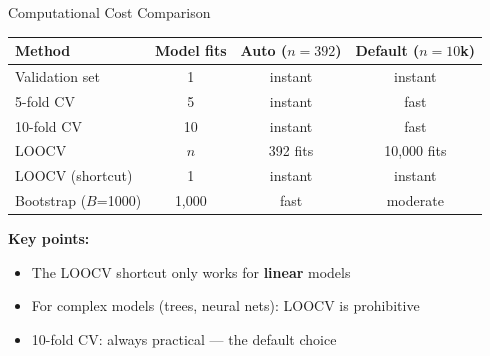 \documentclass[aspectratio=169, 11pt]{beamer}
\begin{document}
\begin{frame}{Computational Cost Comparison}

\begin{center}
\begin{tabular}{lccc}
\toprule
Method & Model fits & Auto ($n=392$) & Default ($n=10$k) \\
\midrule
Validation set & 1 & instant & instant \\
5-fold CV & 5 & instant & fast \\
10-fold CV & 10 & instant & fast \\
LOOCV & $n$ & 392 fits & 10,000 fits \\
LOOCV (shortcut) & 1 & instant & instant \\
Bootstrap ($B$=1000) & 1,000 & fast & moderate \\
\bottomrule
\end{tabular}
\end{center}

\vspace{0.5em}
\textbf{Key points:}
\begin{itemize}
  \item The LOOCV shortcut only works for \textbf{linear} models
  \item For complex models (trees, neural nets): LOOCV is prohibitive
  \item 10-fold CV: always practical --- the default choice
\end{itemize}
\end{frame}
\end{document}
